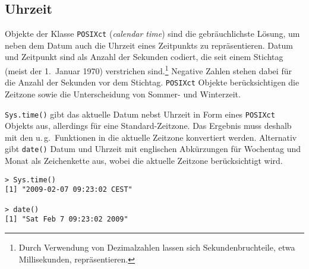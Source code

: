 \subsection{Uhrzeit}

Objekte der Klasse \lstinline!POSIXct! (\emph{calendar time}) sind die gebräuchlichste Lösung, um neben dem Datum auch die Uhrzeit eines Zeitpunkts zu repräsentieren. Datum und Zeitpunkt sind als Anzahl der Sekunden codiert, die seit einem Stichtag (meist der 1.\ Januar 1970) verstrichen sind.\footnote{Durch Verwendung von Dezimalzahlen lassen sich Sekundenbruchteile, etwa Millisekunden, repräsentieren.} Negative Zahlen stehen dabei für die Anzahl der Sekunden vor dem Stichtag. \lstinline!POSIXct! Objekte berücksichtigen die Zeitzone sowie die Unterscheidung von Sommer- und Winterzeit.

\lstinline!Sys.time()! gibt das aktuelle Datum nebst Uhrzeit in Form eines \lstinline!POSIXct! Objekts aus, allerdings für eine Standard-Zeitzone. Das Ergebnis muss deshalb mit den u.\,g.\ Funktionen in die aktuelle Zeitzone konvertiert werden. Alternativ gibt  \lstinline!date()! Datum und Uhrzeit mit englischen Abkürzungen für Wochentag und Monat als Zeichenkette aus, wobei die aktuelle Zeitzone berücksichtigt wird.
\begin{lstlisting}
> Sys.time()
[1] "2009-02-07 09:23:02 CEST"

> date()
[1] "Sat Feb 7 09:23:02 2009"
\end{lstlisting}

